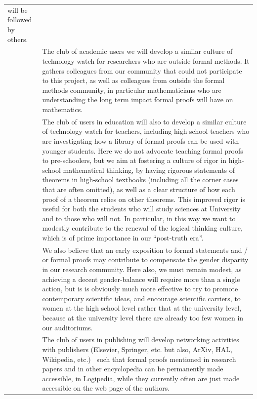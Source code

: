 \begin{longtable}{|p{}|p{}|}
will be followed by others.\\ 
&
\hspace{0.4cm}
The club of academic users
we will develop a similar culture of technology watch for
researchers who are outside formal methods.  
It gathers colleagues from our community that could not participate to
this project, as well as colleagues from outside the formal methods
community, in particular mathematicians who are understanding
the long term impact formal proofs will have on mathematics.\\
&
\hspace{0.4cm}
The club of users in education
will also to develop a similar culture of
technology watch for teachers, including high school teachers who are
investigating how a library of formal proofs can be used with younger
students. Here we do not advocate teaching formal proofs to pre-schoolers, but
we aim at fostering a culture of rigor in high-school mathematical
thinking, by having rigorous statements of theorems in high-school
textbooks (including all the corner cases that are often omitted), as
well as a clear structure of how each proof of a theorem relies on
other theorems. This improved rigor is useful for both the students
who will study sciences at University and to those who will not. In
particular, in this way we want to modestly contribute to the renewal
of the logical thinking culture, which is of prime importance in our
``post-truth era''.\\
&
\hspace{0.4cm}
We also believe that an early exposition to formal statements and / or
formal proofs may contribute to compensate the gender disparity
in our research community. Here also, we must remain modest, as
achieving a decent gender-balance will require more than a single
action, but is is obviously much more effective to try to promote
contemporary scientific ideas, and encourage scientific carriers, to
women at the high school level rather that at the university level,
because at the university level there are already too few women in
our auditoriums.\\
&
\hspace{0.4cm}
The club of users in publishing 
will develop networking activities with publishers
(Elsevier, Springer, etc. but also, ArXiv, HAL, Wikipedia, etc.)~
such that formal proofs mentioned in research papers and in
other encyclopedia can be permanently made accessible, in Logipedia, 
while they currently often are just made accessible
on the web page of the authors.\\

\end{longtable}
